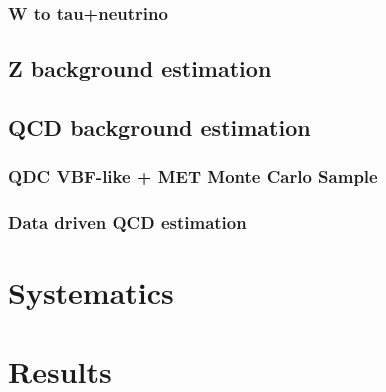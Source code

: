 \subsubsection{W to tau+neutrino}

\subsection{Z background estimation}

\subsection{QCD background estimation}

\subsubsection{QDC VBF-like + MET Monte Carlo Sample}

\subsubsection{Data driven QCD estimation}

\section{Systematics}

\section{Results}

